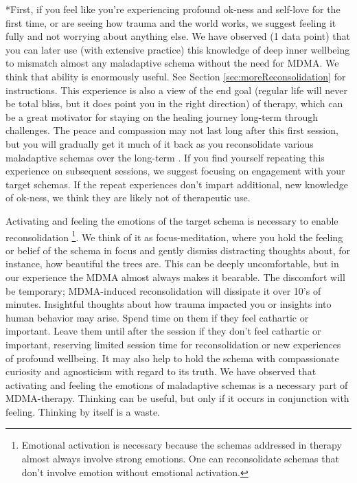 \documentclass[12pt,letterpaper]{article}
\begin{document}
*First, if you feel like you're experiencing profound ok-ness and self-love for the first time, or are seeing how trauma and the world works, we suggest feeling it fully and not worrying about anything else. We have observed (1 data point) that you can later use (with extensive practice) this knowledge of deep inner wellbeing to mismatch almost any maladaptive schema without the need for MDMA. We think that ability is enormously useful. See Section \ref{sec:moreReconsolidation} for instructions. This experience is also a view of the end goal (regular life will never be total bliss, but it does point you in the right direction) of therapy, which can be a great motivator for staying on the healing journey long-term through challenges. The peace and compassion may not last long after this first session, but you will gradually get it much of it back as you reconsolidate various maladaptive schemas over the long-term \cite{evansAfterglow}. If you find yourself repeating this experience on subsequent sessions, we suggest focusing on engagement with your target schemas. If the repeat experiences don't impart additional, new knowledge of ok-ness, we think they are likely not of therapeutic use.


Activating and feeling the emotions of the target schema is necessary to enable reconsolidation \cite{ecker2015misunderstood} \footnote{Emotional activation is necessary because the schemas addressed in therapy almost always involve strong emotions. One can reconsolidate schemas that don't involve emotion without emotional activation.}. We think of it as focus-meditation, where you hold the feeling or belief of the schema in focus and gently dismiss distracting thoughts about, for instance, how beautiful the trees are. This can be deeply uncomfortable, but in our experience the MDMA almost always makes it bearable. The discomfort will be temporary; MDMA-induced reconsolidation will dissipate it over 10's of minutes. Insightful thoughts about how trauma impacted you or insights into human behavior may arise. Spend time on them if they feel cathartic or important. Leave them until after the session if they don't feel cathartic or important, reserving limited session time for reconsolidation or new experiences of profound wellbeing. It may also help to hold the schema with compassionate curiosity and agnosticism with regard to its truth. We have observed that activating and feeling the emotions of maladaptive schemas is a necessary part of MDMA-therapy. Thinking can be useful, but only if it occurs in conjunction with feeling. Thinking by itself is a waste.
\end{document}
